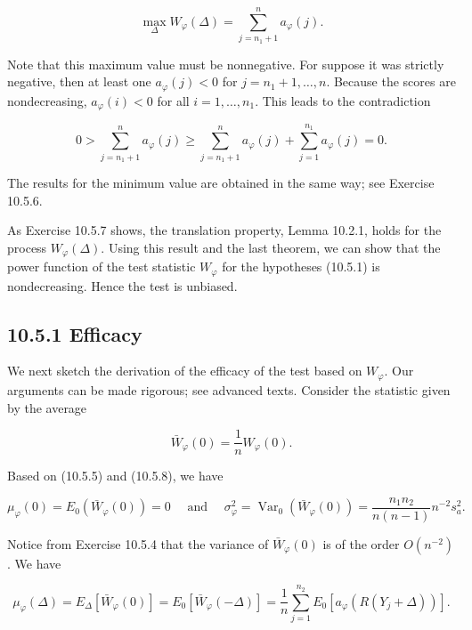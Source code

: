 $$
\max _{\Delta} W_{\varphi}(\Delta)=\sum_{j=n_{1}+1}^{n} a_{\varphi}(j) .
$$

Note that this maximum value must be nonnegative. For suppose it was strictly negative, then at least one $a_{\varphi}(j)<0$ for $j=n_{1}+1, \ldots, n$. Because the scores are nondecreasing, $a_{\varphi}(i)<0$ for all $i=1, \ldots, n_{1}$. This leads to the contradiction

$$
0>\sum_{j=n_{1}+1}^{n} a_{\varphi}(j) \geq \sum_{j=n_{1}+1}^{n} a_{\varphi}(j)+\sum_{j=1}^{n_{1}} a_{\varphi}(j)=0 .
$$

The results for the minimum value are obtained in the same way; see Exercise 10.5.6.

As Exercise 10.5.7 shows, the translation property, Lemma 10.2.1, holds for the process $W_{\varphi}(\Delta)$. Using this result and the last theorem, we can show that the power function of the test statistic $W_{\varphi}$ for the hypotheses (10.5.1) is nondecreasing. Hence the test is unbiased.

\subsection*{10.5.1 Efficacy}
We next sketch the derivation of the efficacy of the test based on $W_{\varphi}$. Our arguments can be made rigorous; see advanced texts. Consider the statistic given by the average


\begin{equation*}
\bar{W}_{\varphi}(0)=\frac{1}{n} W_{\varphi}(0) . \tag{10.5.11}
\end{equation*}


Based on (10.5.5) and (10.5.8), we have


\begin{equation*}
\mu_{\varphi}(0)=E_{0}\left(\bar{W}_{\varphi}(0)\right)=0 \quad \text { and } \quad \sigma_{\varphi}^{2}=\operatorname{Var}_{0}\left(\bar{W}_{\varphi}(0)\right)=\frac{n_{1} n_{2}}{n(n-1)} n^{-2} s_{a}^{2} . \tag{10.5.12}
\end{equation*}


Notice from Exercise 10.5.4 that the variance of $\bar{W}_{\varphi}(0)$ is of the order $O\left(n^{-2}\right)$. We have


\begin{equation*}
\mu_{\varphi}(\Delta)=E_{\Delta}\left[\bar{W}_{\varphi}(0)\right]=E_{0}\left[\bar{W}_{\varphi}(-\Delta)\right]=\frac{1}{n} \sum_{j=1}^{n_{2}} E_{0}\left[a_{\varphi}\left(R\left(Y_{j}+\Delta\right)\right)\right] . \tag{10.5.13}
\end{equation*}


